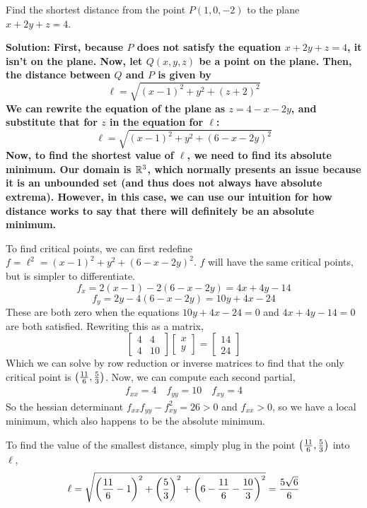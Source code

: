 \begin{example}
    Find the shortest distance from the point \(P(1, 0, -2)\) to the plane \(x+2y+z=4\).\par\bf{Solution: }
    First, because \(P\) does not satisfy the equation \(x+2y+z=4\), it isn't on the plane. Now, let \(Q(x,y,z)\) be a point on the plane. Then, the distance between \(Q\) and \(P\) is given by
    \[ \ell = \sqrt{(x-1)^2 + y^2 + (z+2)^2} \]
    We can rewrite the equation of the plane as \(z=4-x-2y\), and substitute that for \(z\) in the equation for \(\ell\):
    \[ \ell = \sqrt{(x-1)^2+y^2+(6-x-2y)^2}\] Now, to find the shortest value of \(\ell\), we need to find its absolute minimum. Our domain is \(\mathbb{R}^3\), which normally presents an issue because it is an unbounded set (and thus does not always have absolute extrema). However, in this case, we can use our intuition for how distance works to say that there will definitely be an absolute minimum.\par
    To find critical points, we can first redefine \(f=\ell^2 = (x-1)^2+y^2+(6-x-2y)^2\). \(f\) will have the same critical points, but is simpler to differentiate.
    \[ f_x = 2(x-1)-2(6-x-2y) = 4x+4y-14  \]
    \[ f_y = 2y-4(6-x-2y) = 10y + 4x-24\]
    These are both zero when the equations \(10y+4x-24=0\) and \(4x+4y-14=0\) are both satisfied. Rewriting this as a matrix,
    \[ \begin{bmatrix}
        4 & 4 \\ 4 & 10
    \end{bmatrix}\begin{bmatrix}
        x\\y
    \end{bmatrix} = \begin{bmatrix}
        14 \\ 24
    \end{bmatrix}\]
    Which we can solve by row reduction or inverse matrices to find that the only critical point is \(\pqty{\frac{11}{6}, \frac{5}{3}}\). Now, we can compute each second partial,
    \begin{align*}
        f_{xx} = 4 \quad f_{yy} = 10 \quad f_{xy} = 4
    \end{align*}
    So the hessian determinant \(f_{xx}f_{yy}-f_{xy}^2 = 26 > 0\) and \(f_{xx}>0\), so we have a local minimum, which also happens to be the absolute minimum.\par To find the value of the smallest distance, simply plug in the point \(\pqty{\frac{11}{6}, \frac{5}{3}}\) into \(\ell\),
    \[ \ell = \sqrt{\pqty{\frac{11}{6}-1}^2+\pqty{\frac{5}{3}}^2+\pqty{6-\frac{11}{6}-\frac{10}{3}}^2} = \frac{5\sqrt6}{6}\]
\end{example}
